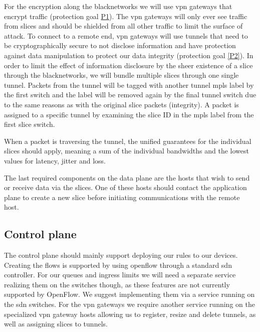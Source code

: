 For the encryption along the \gls{blacknetwork}s we will use \acrshort{vpn} gateways that encrypt traffic (protection goal \hyperref[P1]{P1}). The \acrshort{vpn} gateways will only ever see traffic from slices and should be shielded from all other traffic to limit the surface of attack. To connect to a remote end, \acrshort{vpn} gateways will use tunnels that need to be cryptographically secure to not disclose information and have protection against data manipulation to protect our data integrity (protection goal \ref{P2}). In order to limit the effect of information disclosure by the sheer existence of a slice through the \gls{blacknetwork}s, we will bundle multiple slices through one single tunnel. Packets from the tunnel will be tagged with another tunnel \acrshort{mpls} label by the first switch and the label will be removed again by the final tunnel switch due to the same reasons as with the original slice packets (integrity). A packet is assigned to a specific tunnel by examining the slice ID in the \acrshort{mpls} label from the first slice switch.


When a packet is traversing the tunnel, the unified guarantees for the individual slices should apply, meaning a sum of the individual \gls{bandwidth}s and the lowest values for \gls{latency}, \gls{jitter} and loss.

The last required components on the data plane are the hosts that wish to send or receive data via the slices. One of these hosts should contact the application plane to create a new slice before initiating communications with the remote host.

\subsection{Control plane}
The control plane should mainly support deploying our rules to our devices. Creating the flows is supported by using \Gls{openflow} through a standard \acrshort{sdn} controller. For our queues and ingress limits we will need a separate service realizing them on the switches though, as these features are not currently supported by OpenFlow. We suggest implementing them via a service running on the \acrshort{sdn} switches. For the \acrshort{vpn} gateways we require another service running on the specialized \acrshort{vpn} gateway hosts allowing us to register, resize and delete tunnels, as well as assigning slices to tunnels.

